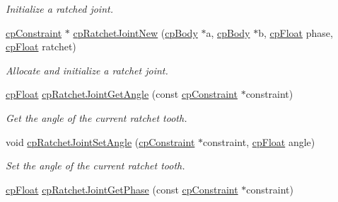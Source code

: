 \begin{DoxyCompactItemize}
\begin{DoxyCompactList}\small\item\em Initialize a ratched joint. \end{DoxyCompactList}\item 
\hypertarget{group__cp_ratchet_joint_ga6743e0aee6389ecc2bc10ee42e5baaec}{}\hyperlink{structcp_constraint}{cp\+Constraint} $\ast$ \hyperlink{group__cp_ratchet_joint_ga6743e0aee6389ecc2bc10ee42e5baaec}{cp\+Ratchet\+Joint\+New} (\hyperlink{structcp_body}{cp\+Body} $\ast$a, \hyperlink{structcp_body}{cp\+Body} $\ast$b, \hyperlink{group__basic_types_gac1ed65573e035bf892505768c852d8d3}{cp\+Float} phase, \hyperlink{group__basic_types_gac1ed65573e035bf892505768c852d8d3}{cp\+Float} ratchet)\label{group__cp_ratchet_joint_ga6743e0aee6389ecc2bc10ee42e5baaec}

\begin{DoxyCompactList}\small\item\em Allocate and initialize a ratchet joint. \end{DoxyCompactList}\item 
\hypertarget{group__cp_ratchet_joint_ga7da0b48c0c9dd7554de5035b6f6c5bf4}{}\hyperlink{group__basic_types_gac1ed65573e035bf892505768c852d8d3}{cp\+Float} \hyperlink{group__cp_ratchet_joint_ga7da0b48c0c9dd7554de5035b6f6c5bf4}{cp\+Ratchet\+Joint\+Get\+Angle} (const \hyperlink{structcp_constraint}{cp\+Constraint} $\ast$constraint)\label{group__cp_ratchet_joint_ga7da0b48c0c9dd7554de5035b6f6c5bf4}

\begin{DoxyCompactList}\small\item\em Get the angle of the current ratchet tooth. \end{DoxyCompactList}\item 
\hypertarget{group__cp_ratchet_joint_gac5307c6e685d59c6d7fc133be4ee6d5e}{}void \hyperlink{group__cp_ratchet_joint_gac5307c6e685d59c6d7fc133be4ee6d5e}{cp\+Ratchet\+Joint\+Set\+Angle} (\hyperlink{structcp_constraint}{cp\+Constraint} $\ast$constraint, \hyperlink{group__basic_types_gac1ed65573e035bf892505768c852d8d3}{cp\+Float} angle)\label{group__cp_ratchet_joint_gac5307c6e685d59c6d7fc133be4ee6d5e}

\begin{DoxyCompactList}\small\item\em Set the angle of the current ratchet tooth. \end{DoxyCompactList}\item 
\hypertarget{group__cp_ratchet_joint_ga0da20967d6bbb36ceb2cddb5d2ca5d6a}{}\hyperlink{group__basic_types_gac1ed65573e035bf892505768c852d8d3}{cp\+Float} \hyperlink{group__cp_ratchet_joint_ga0da20967d6bbb36ceb2cddb5d2ca5d6a}{cp\+Ratchet\+Joint\+Get\+Phase} (const \hyperlink{structcp_constraint}{cp\+Constraint} $\ast$constraint)\label{group__cp_ratchet_joint_ga0da20967d6bbb36ceb2cddb5d2ca5d6a}


\end{DoxyCompactItemize}
